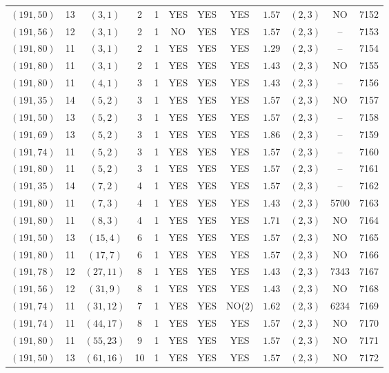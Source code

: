 \begin{longtable}{|c|c|c|c|c|c|c|c|c|c|c|c|}
$(191,50)$ & 13 & $(3,1)$ & 2 & 1 & YES & YES & YES & $1.57$ & $(2,3)$ & NO & 7152\\
$(191,56)$ & 12 & $(3,1)$ & 2 & 1 & NO & YES & YES & $1.57$ & $(2,3)$ & -- & 7153\\
$(191,80)$ & 11 & $(3,1)$ & 2 & 1 & YES & YES & YES & $1.29$ & $(2,3)$ & -- & 7154\\
$(191,80)$ & 11 & $(3,1)$ & 2 & 1 & YES & YES & YES & $1.43$ & $(2,3)$ & NO & 7155\\
$(191,80)$ & 11 & $(4,1)$ & 3 & 1 & YES & YES & YES & $1.43$ & $(2,3)$ & -- & 7156\\
$(191,35)$ & 14 & $(5,2)$ & 3 & 1 & YES & YES & YES & $1.57$ & $(2,3)$ & NO & 7157\\
$(191,50)$ & 13 & $(5,2)$ & 3 & 1 & YES & YES & YES & $1.57$ & $(2,3)$ & -- & 7158\\
$(191,69)$ & 13 & $(5,2)$ & 3 & 1 & YES & YES & YES & $1.86$ & $(2,3)$ & -- & 7159\\
$(191,74)$ & 11 & $(5,2)$ & 3 & 1 & YES & YES & YES & $1.57$ & $(2,3)$ & -- & 7160\\
$(191,80)$ & 11 & $(5,2)$ & 3 & 1 & YES & YES & YES & $1.57$ & $(2,3)$ & -- & 7161\\
$(191,35)$ & 14 & $(7,2)$ & 4 & 1 & YES & YES & YES & $1.57$ & $(2,3)$ & -- & 7162\\
$(191,80)$ & 11 & $(7,3)$ & 4 & 1 & YES & YES & YES & $1.43$ & $(2,3)$ & 5700 & 7163\\
$(191,80)$ & 11 & $(8,3)$ & 4 & 1 & YES & YES & YES & $1.71$ & $(2,3)$ & NO & 7164\\
$(191,50)$ & 13 & $(15,4)$ & 6 & 1 & YES & YES & YES & $1.57$ & $(2,3)$ & NO & 7165\\
$(191,80)$ & 11 & $(17,7)$ & 6 & 1 & YES & YES & YES & $1.57$ & $(2,3)$ & NO & 7166\\
$(191,78)$ & 12 & $(27,11)$ & 8 & 1 & YES & YES & YES & $1.43$ & $(2,3)$ & 7343 & 7167\\
$(191,56)$ & 12 & $(31,9)$ & 8 & 1 & YES & YES & YES & $1.43$ & $(2,3)$ & NO & 7168\\
$(191,74)$ & 11 & $(31,12)$ & 7 & 1 & YES & YES & NO(2) & $1.62$ & $(2,3)$ & 6234 & 7169\\
$(191,74)$ & 11 & $(44,17)$ & 8 & 1 & YES & YES & YES & $1.57$ & $(2,3)$ & NO & 7170\\
$(191,80)$ & 11 & $(55,23)$ & 9 & 1 & YES & YES & YES & $1.57$ & $(2,3)$ & NO & 7171\\
$(191,50)$ & 13 & $(61,16)$ & 10 & 1 & YES & YES & YES & $1.57$ & $(2,3)$ & NO & 7172\\

\end{longtable}
